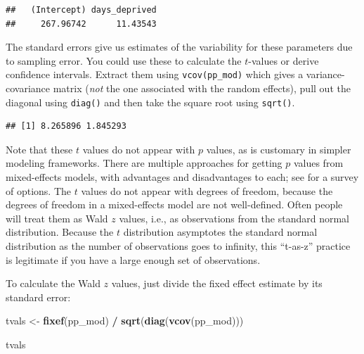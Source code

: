 \documentclass[]{book}
\newenvironment{Shaded}{\begin{snugshade}}{\end{snugshade}}
\newcommand{\CommentTok}[1]{\textcolor[rgb]{0.56,0.35,0.01}{\textit{#1}}}
\newcommand{\KeywordTok}[1]{\textcolor[rgb]{0.13,0.29,0.53}{\textbf{#1}}}
\newcommand{\NormalTok}[1]{#1}
\newcommand{\OperatorTok}[1]{\textcolor[rgb]{0.81,0.36,0.00}{\textbf{#1}}}
\newcommand{\StringTok}[1]{\textcolor[rgb]{0.31,0.60,0.02}{#1}}
\begin{document}
\begin{verbatim}
##   (Intercept) days_deprived 
##     267.96742      11.43543
\end{verbatim}

The standard errors give us estimates of the variability for these parameters due to sampling error. You could use these to calculate the \(t\)-values or derive confidence intervals. Extract them using \texttt{vcov(pp\_mod)} which gives a variance-covariance matrix (\emph{not} the one associated with the random effects), pull out the diagonal using \texttt{diag()} and then take the square root using \texttt{sqrt()}.

\begin{Shaded}
\end{Shaded}

\begin{verbatim}
## [1] 8.265896 1.845293
\end{verbatim}

Note that these \(t\) values do not appear with \(p\) values, as is customary in simpler modeling frameworks. There are multiple approaches for getting \(p\) values from mixed-effects models, with advantages and disadvantages to each; see \citet{Luke_2017} for a survey of options. The \(t\) values do not appear with degrees of freedom, because the degrees of freedom in a mixed-effects model are not well-defined. Often people will treat them as Wald \(z\) values, i.e., as observations from the standard normal distribution. Because the \(t\) distribution asymptotes the standard normal distribution as the number of observations goes to infinity, this ``t-as-z'' practice is legitimate if you have a large enough set of observations.

To calculate the Wald \(z\) values, just divide the fixed effect estimate by its standard error:

\begin{Shaded}
\begin{Highlighting}[]
\NormalTok{tvals <-}\StringTok{ }\KeywordTok{fixef}\NormalTok{(pp_mod) }\OperatorTok{/}\StringTok{ }\KeywordTok{sqrt}\NormalTok{(}\KeywordTok{diag}\NormalTok{(}\KeywordTok{vcov}\NormalTok{(pp_mod)))}

\NormalTok{tvals}
\end{Highlighting}
\end{Shaded}
\end{document}

